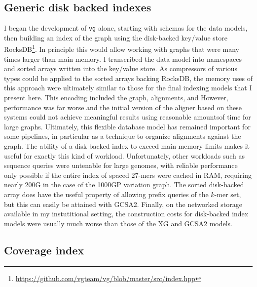\subsection{Generic disk backed indexes}
\label{sec:generic_disk_backed_indexes}
I began the development of {\tt vg} alone, starting with schemas for the data models, then building an index of the graph using the disk-backed key/value store RocksDB\footnote{\url{https://github.com/vgteam/vg/blob/master/src/index.hpp}}.
In principle this would allow working with graphs that were many times larger than main memory.
I transcribed the data model into namespaces and sorted arrays written into the key/value store.
As compressors of various types could be applied to the sorted arrays backing RocksDB, the memory uses of this approach were ultimately similar to those for the final indexing models that I present here.
This encoding included the graph, alignments, and 
However, performance was far worse and the initial version of the aligner based on these systems could not achieve meaningful results using reasonable amountsof time for large graphs.
Ultimately, this flexible database model has remained important for some pipelines, in particular as a technique to organize alignments against the graph.
The ability of a disk backed index to exceed main memory limits makes it useful for exactly this kind of workload.
Unfortunately, other workloads such as sequence queries were untenable for large genomes, with reliable performance only possible if the entire index of spaced $27$-mers were cached in RAM, requiring nearly 200G in the case of the 1000GP variation graph.
The sorted disk-backed array does have the useful property of allowing prefix queries of the $k$-mer set, but this can easily be attained with GCSA2.
Finally, on the networked storage available in my instutitional setting, the construction costs for disk-backed index models were usually much worse than those of the XG and GCSA2 models.

\subsection{Coverage index}
\label{sec:coverage_index}

